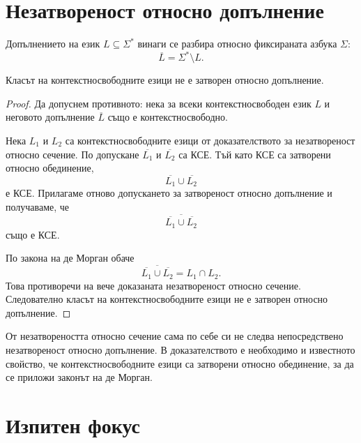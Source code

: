 \section{Незатвореност относно допълнение}\label{s:5.6}

Допълнението на език $L\subseteq\Sigma^*$ винаги се разбира относно фиксираната азбука $\Sigma$:
\[
\overline{L}=\Sigma^*\setminus L.
\]

\begin{thm}
Класът на контекстносвободните езици не е затворен относно допълнение.
\end{thm}

\begin{proof}
Да допуснем противното: нека за всеки контекстносвободен език $L$ и неговото допълнение $\overline{L}$ също е контекстносвободно.

Нека $L_1$ и $L_2$ са контекстносвободните езици от доказателството за незатвореност относно сечение. По допускане $\overline{L_1}$ и $\overline{L_2}$ са КСЕ. Тъй като КСЕ са затворени относно обединение,
\[
\overline{L_1}\cup\overline{L_2}
\]
е КСЕ. Прилагаме отново допускането за затвореност относно допълнение и получаваме, че
\[
\overline{\overline{L_1}\cup\overline{L_2}}
\]
също е КСЕ.

По закона на де Морган обаче
\[
\overline{\overline{L_1}\cup\overline{L_2}}
=
L_1\cap L_2.
\]
Това противоречи на вече доказаната незатвореност относно сечение. Следователно класът на контекстносвободните езици не е затворен относно допълнение.
\end{proof}

\begin{supp}[Бележка]
От незатвореността относно сечение сама по себе си не следва непосредствено незатвореност относно допълнение. В доказателството е необходимо и известното свойство, че контекстносвободните езици са затворени относно обединение, за да се приложи законът на де Морган.
\end{supp}

\section{Изпитен фокус}\label{s:5.7}

